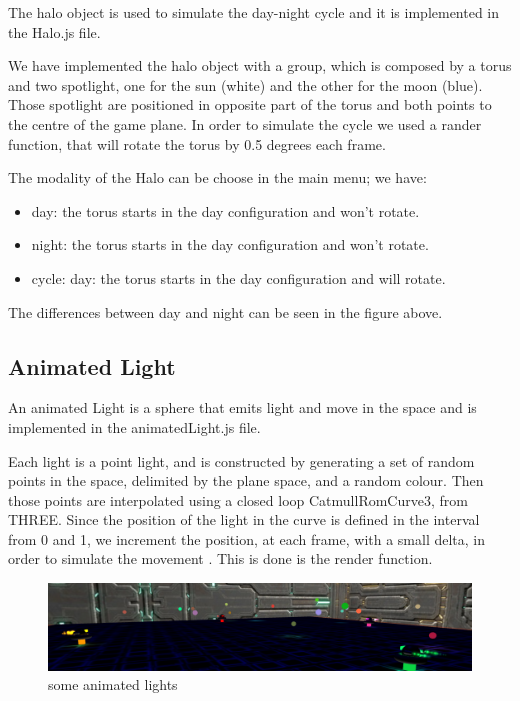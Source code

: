 \documentclass[11pt]{article}
\begin{document}
The halo object is used to simulate the day-night cycle and it is implemented in the Halo.js file.

We have implemented the halo object with a group, which is composed by a torus and two spotlight, one for the sun (white) and the other for the moon (blue). Those spotlight are positioned in opposite part of the torus and both points to the centre of the game plane.  
In order to simulate the cycle we used a rander function, that will rotate the torus by 0.5 degrees each frame.

The modality of the Halo can be choose in the main menu; we have:
\begin{itemize}
	\item day: the torus starts in the day configuration and won't rotate.
	\item night: the torus starts in the day configuration and won't rotate.
	\item cycle: day: the torus starts in the day configuration and will rotate.
\end{itemize}
The differences between day and night can be seen in the figure above.
\FloatBarrier

\subsection{Animated Light}

An animated Light is a sphere that emits light and move in the space and is implemented in the animatedLight.js file.

Each light is a point light, and is constructed by generating a set of random points in the space, delimited by the plane space, and a random colour. Then those points are interpolated using a closed loop CatmullRomCurve3, from THREE. Since the position of the light in the curve is defined in the interval from 0 and 1, we increment the position, at each frame, with a small delta, in order to simulate the movement . This is done is the render function.  	
\begin{figure}
	\centering
	\includegraphics[width=\linewidth]{animatedLight}
	\caption{some animated lights}
\end{figure}
\FloatBarrier
\end{document}

